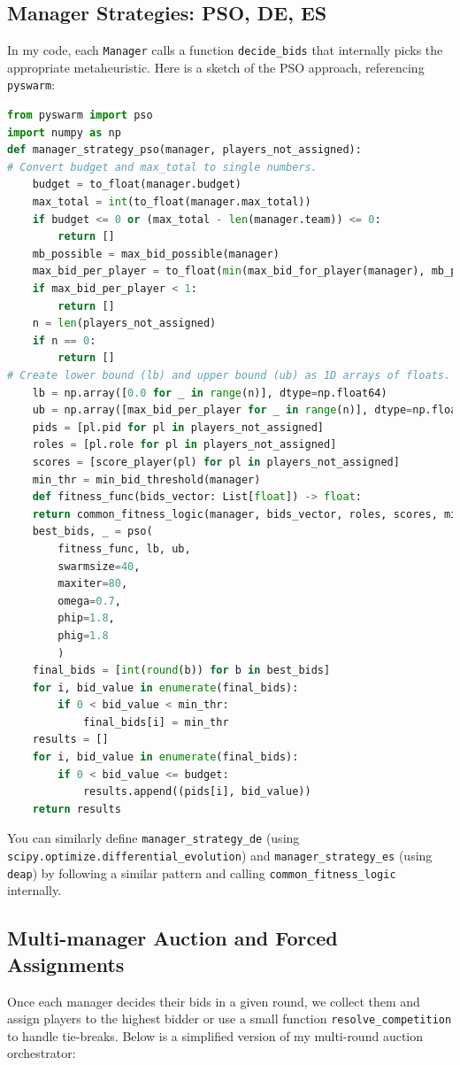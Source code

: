 \documentclass[sigconf]{acmart}
\begin{document}
	\subsection{Manager Strategies: PSO, DE, ES}
	In my code, each \texttt{Manager} calls a function \texttt{decide\_bids} that internally picks the appropriate metaheuristic. Here is a sketch of the PSO approach, referencing \texttt{pyswarm}:
	
\begin{lstlisting}[language=Python, caption=manager strategy pso]
from pyswarm import pso
import numpy as np
def manager_strategy_pso(manager, players_not_assigned):
# Convert budget and max_total to single numbers.
	budget = to_float(manager.budget)
	max_total = int(to_float(manager.max_total))
	if budget <= 0 or (max_total - len(manager.team)) <= 0:
		return []
	mb_possible = max_bid_possible(manager)
	max_bid_per_player = to_float(min(max_bid_for_player(manager), mb_possible))
	if max_bid_per_player < 1:
		return []
	n = len(players_not_assigned)
	if n == 0:
		return []
# Create lower bound (lb) and upper bound (ub) as 1D arrays of floats.
	lb = np.array([0.0 for _ in range(n)], dtype=np.float64)
	ub = np.array([max_bid_per_player for _ in range(n)], dtype=np.float64)
	pids = [pl.pid for pl in players_not_assigned]
	roles = [pl.role for pl in players_not_assigned]
	scores = [score_player(pl) for pl in players_not_assigned]
	min_thr = min_bid_threshold(manager)
	def fitness_func(bids_vector: List[float]) -> float:
	return common_fitness_logic(manager, bids_vector, roles, scores, min_thr)
	best_bids, _ = pso(
		fitness_func, lb, ub,
		swarmsize=40,
		maxiter=80,
		omega=0.7,
		phip=1.8,
		phig=1.8
		)
	final_bids = [int(round(b)) for b in best_bids]
	for i, bid_value in enumerate(final_bids):
		if 0 < bid_value < min_thr:
			final_bids[i] = min_thr
	results = []
	for i, bid_value in enumerate(final_bids):
		if 0 < bid_value <= budget:
			results.append((pids[i], bid_value))
	return results
\end{lstlisting} 
	
	You can similarly define \texttt{manager\_strategy\_de}
	(using \texttt{scipy.optimize.differential\_evolution}) and \texttt{manager\_strategy\_es} (using \texttt{deap}) by following a similar pattern and calling \texttt{common\_fitness\_logic} internally.
	
	\subsection{Multi-manager Auction and Forced Assignments}
	Once each manager decides their bids in a given round, we collect them and assign players to the highest bidder or use a small function \texttt{resolve\_competition} to handle tie-breaks. Below is a simplified version of my multi-round auction orchestrator:
	
\end{document}
